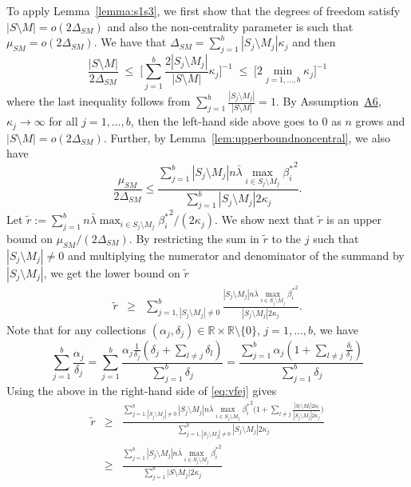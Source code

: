 \documentclass[bj,authoryear]{imsart}
\theoremstyle{plain}
\newcommand{\R}{\mathbb{R}}
\begin{document}
To apply Lemma~\ref{lemma:s1s3}, we first show that the degrees of freedom satisfy $|S\setminus M|=o(2\Delta_{SM})$ and also the non-centrality parameter is such that $\mu_{SM}=o(2\Delta_{SM})$.
We have that $\Delta_{SM}=\sum_{j=1}^b|S_j \setminus M_j|\kappa_j$ and then
$$\frac{|S\setminus M|}{2\Delta_{SM}}\;\leq\; \bigg[\sum_{j=1}^b\frac{2|S_j \setminus M_j|}{|S\setminus M|}\kappa_j \bigg]^{-1} \;\leq\; \Big[ 2\min_{j=1,\ldots,b}\kappa_j \Big]^{-1} $$
where the last inequality follows from $\sum_{j=1}^b\frac{|S_j \setminus M_j|}{|S\setminus M|}=1$. By Assumption~\hyperlink{lab:A6}{A6}, $\kappa_j\to \infty$ for all $j=1,\ldots,b$, then the left-hand side above goes to 0 as $n$ grows and $|S\setminus M|=o(2\Delta_{SM})$. Further, by Lemma~\ref{lem:upperboundnoncentral}, we also have
\begin{equation}\label{eq:AGEoj}
    \frac{\mu_{SM}}{2\Delta_{SM}}\leq \frac{ \sum_{j=1}^b |S_j\setminus M_j|n\bar{\lambda}\max_{i\in S_j\setminus M_j}{\beta_i^*}^2}{\sum_{j=1}^b |S_j\setminus M_j|2 \kappa_j}.
\end{equation}
Let $\tilde{r}:=\sum_{j=1}^b n\bar{\lambda}\max_{i\in S_j\setminus M_j}{\beta_i^*}^2/(2\kappa_j)$. We show next that $\tilde{r}$ is an upper bound on $\mu_{SM}/(2\Delta_{SM})$. By restricting the sum in $\tilde{r}$ to the $j$ such that $|S_j\setminus M_j|\neq 0$ and multiplying the numerator and denominator of the summand by $|S_j\setminus M_j|$, we get the lower bound on $\tilde{r}$
\begin{eqnarray}\label{eq:vfej}
    \tilde{r}
    &\geq &\sum_{j=1,|S_j\setminus M_j|\neq 0}^b\frac{|S_j\setminus M_j|n\bar{\lambda}\max_{i\in S_j\setminus M_j}{\beta_i^*}^2}{|S_j\setminus M_j|2\kappa_j} .\end{eqnarray}
Note that for any collections $(\alpha_j,\delta_j)\in  \R\times \R\setminus\{0\}$, $j=1,\ldots,b$, we have
\begin{equation}\label{eq:truc}
    \sum_{j=1}^b\frac{\alpha_j}{\delta_j}=
\sum_{j=1}^b\frac{\alpha_j \frac{1}{\delta_j} (\delta_j + \sum_{l \neq j} \delta_l)}{\sum_{j=1}^b \delta_j}=
    \frac{\sum_{j=1}^b\alpha_j(1+\sum_{l\neq j} \frac{\delta_l}{\delta_j})}{\sum_{j=1}^b\delta_j}
\end{equation}
Using the above in the right-hand side of \eqref{eq:vfej} gives
\begin{eqnarray*}
    \tilde{r}
    &\geq& \frac{\sum_{j=1,|S_j\setminus M_j|\neq 0 }^b|S_j\setminus M_j|n\bar{\lambda}\max_{i\in S_j\setminus M_j}{\beta_i^*}^2\Big(1+\sum_{l\neq j}\frac{|S_l\setminus M_l|2\kappa_l}{|S_j\setminus M_j|2\kappa_j}\Big)}{\sum_{j=1,|S_j\setminus M_j|\neq 0 }^b|S_j\setminus M_j|2\kappa_j} \\
    &\geq & \frac{\sum_{j=1}^b|S_j\setminus M_j|n\bar{\lambda}\max_{i\in S_j\setminus M_j}{\beta_i^*}^2}{\sum_{j=1}^b \big|S\setminus M_j\big|2\kappa_j}
\end{eqnarray*}
\end{document}

